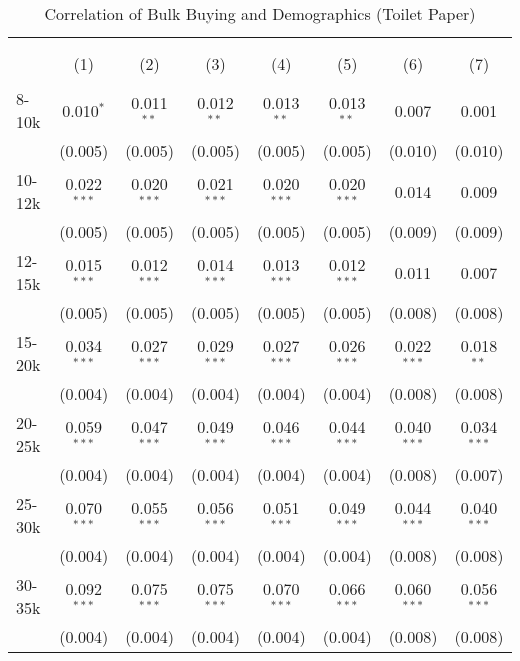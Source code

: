 
\begin{table}[!htbp] \centering 
  \caption{Correlation of Bulk Buying and Demographics (Toilet Paper)} 
  \label{tab:discountingBehavior7260} 
\begin{tabular}{@{\extracolsep{5pt}}lccccccc} 
\\[-1.8ex]\hline 
\hline \\[-1.8ex] 
\\[-1.8ex] & (1) & (2) & (3) & (4) & (5) & (6) & (7)\\ 
\hline \\[-1.8ex] 
 8-10k & 0.010$^{*}$ & 0.011$^{**}$ & 0.012$^{**}$ & 0.013$^{**}$ & 0.013$^{**}$ & 0.007 & 0.001 \\ 
  & (0.005) & (0.005) & (0.005) & (0.005) & (0.005) & (0.010) & (0.010) \\ 
  10-12k & 0.022$^{***}$ & 0.020$^{***}$ & 0.021$^{***}$ & 0.020$^{***}$ & 0.020$^{***}$ & 0.014 & 0.009 \\ 
  & (0.005) & (0.005) & (0.005) & (0.005) & (0.005) & (0.009) & (0.009) \\ 
  12-15k & 0.015$^{***}$ & 0.012$^{***}$ & 0.014$^{***}$ & 0.013$^{***}$ & 0.012$^{***}$ & 0.011 & 0.007 \\ 
  & (0.005) & (0.005) & (0.005) & (0.005) & (0.005) & (0.008) & (0.008) \\ 
  15-20k & 0.034$^{***}$ & 0.027$^{***}$ & 0.029$^{***}$ & 0.027$^{***}$ & 0.026$^{***}$ & 0.022$^{***}$ & 0.018$^{**}$ \\ 
  & (0.004) & (0.004) & (0.004) & (0.004) & (0.004) & (0.008) & (0.008) \\ 
  20-25k & 0.059$^{***}$ & 0.047$^{***}$ & 0.049$^{***}$ & 0.046$^{***}$ & 0.044$^{***}$ & 0.040$^{***}$ & 0.034$^{***}$ \\ 
  & (0.004) & (0.004) & (0.004) & (0.004) & (0.004) & (0.008) & (0.007) \\ 
  25-30k & 0.070$^{***}$ & 0.055$^{***}$ & 0.056$^{***}$ & 0.051$^{***}$ & 0.049$^{***}$ & 0.044$^{***}$ & 0.040$^{***}$ \\ 
  & (0.004) & (0.004) & (0.004) & (0.004) & (0.004) & (0.008) & (0.008) \\ 
  30-35k & 0.092$^{***}$ & 0.075$^{***}$ & 0.075$^{***}$ & 0.070$^{***}$ & 0.066$^{***}$ & 0.060$^{***}$ & 0.056$^{***}$ \\ 
  & (0.004) & (0.004) & (0.004) & (0.004) & (0.004) & (0.008) & (0.008) \\ 

\end{tabular}
\end{table}
